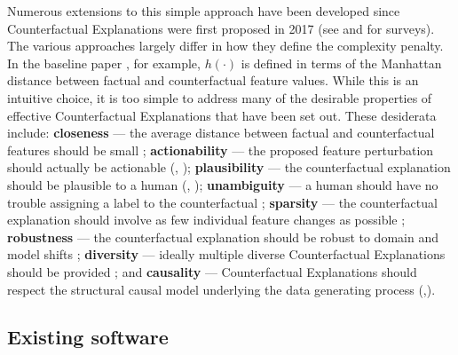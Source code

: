 \documentclass[
  letterpaper,
  DIV=11,
  numbers=noendperiod]{scrartcl}
\begin{document}
Numerous extensions to this simple approach have been developed since
Counterfactual Explanations were first proposed in 2017 (see
\cite{verma2020counterfactual} and \cite{karimi2020survey} for surveys).
The various approaches largely differ in how they define the complexity
penalty. In the baseline paper \cite{wachter2017counterfactual}, for
example, \(h(\cdot)\) is defined in terms of the Manhattan distance
between factual and counterfactual feature values. While this is an
intuitive choice, it is too simple to address many of the desirable
properties of effective Counterfactual Explanations that have been set
out. These desiderata include: \textbf{closeness} --- the average
distance between factual and counterfactual features should be small
\cite{wachter2017counterfactual}; \textbf{actionability} --- the
proposed feature perturbation should actually be actionable
(\cite{ustun2019actionable}, \cite{poyiadzi2020face});
\textbf{plausibility} --- the counterfactual explanation should be
plausible to a human (\cite{joshi2019realistic},
\cite{schut2021generating}); \textbf{unambiguity} --- a human should
have no trouble assigning a label to the counterfactual
\cite{schut2021generating}; \textbf{sparsity} --- the counterfactual
explanation should involve as few individual feature changes as possible
\cite{schut2021generating}; \textbf{robustness} --- the counterfactual
explanation should be robust to domain and model shifts
\cite{upadhyay2021robust}; \textbf{diversity} --- ideally multiple
diverse Counterfactual Explanations should be provided
\cite{mothilal2020explaining}; and \textbf{causality} --- Counterfactual
Explanations should respect the structural causal model underlying the
data generating process
(\cite{karimi2020algorithmic},\cite{karimi2021algorithmic}).

\hypertarget{existing-software}{%
\subsection{Existing software}\label{existing-software}}
\end{document}
